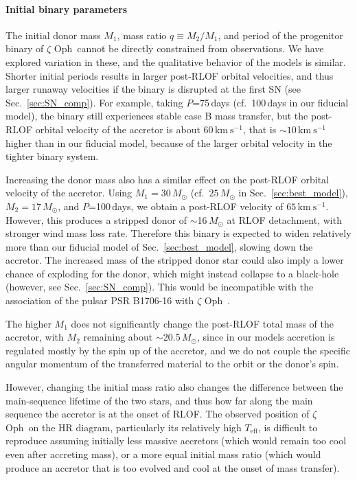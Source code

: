 \documentclass[twocolumn,twocolappendix,trackchanges]{aastex63}
\newcommand{\kms}{{\mathrm{km\ s^{-1}}}}
\DeclareRobustCommand{\Secref}[1]{Sec.~\ref{#1}}
\newcommand{\zoph}{$\zeta$ Oph}
\begin{document}
\paragraph{Initial binary parameters}
The initial donor mass $M_1$, mass ratio $q\equiv M_2/M_1$, and
period of the progenitor binary of \zoph\ cannot be directly
constrained from observations. We have explored variation in these,
and the qualitative behavior of the models is similar.  Shorter
initial periods results in larger post-RLOF orbital velocities, and
thus larger runaway velocities if the binary is disrupted at the first
SN (see \Secref{sec:SN_comp}). For example, taking $P$=75\,days (cf.\
100\,days in our fiducial model), the binary still experiences stable
case B mass transfer, but the post-RLOF orbital velocity of the
accretor is about $60\,\kms$, that is $\sim{}10\,\kms$ higher than in
our fiducial model, because of the larger orbital velocity in the
tighter binary system.

Increasing the donor mass also has a similar effect on the post-RLOF
orbital velocity of the accretor. Using $M_1=30\,M_\odot$ (cf.\
$25\,M_\odot$ in \Secref{sec:best_model}), $M_2=17\,M_\odot$, and
$P$=100\,days, we obtain a post-RLOF velocity of $65\,\kms$. However,
this produces a stripped donor of $\sim$16\,$M_\odot$ at RLOF
detachment, with stronger wind mass loss rate. Therefore this binary
is expected to widen relatively more than our fiducial model of
\Secref{sec:best_model}, slowing down the accretor. The increased mass
of the stripped donor star could also imply a lower chance of
exploding for the donor, which might instead collapse to a black-hole
(however, see \Secref{sec:SN_comp}). This would be incompatible with
the association of the pulsar PSR B1706-16 with \zoph\ \citep{neuhauser:20}.

The higher $M_1$ does not significantly change the post-RLOF total
mass of the accretor, with $M_2$ remaining about $\sim$20.5\,$M_\odot$, since
in our models accretion is regulated mostly by the spin up of the
accretor, and we do not couple the specific angular momentum of the transferred
material to the orbit or the donor's spin.

However, changing the initial mass ratio also changes the difference
between the main-sequence lifetime of the two stars, and thus how far
along the main sequence the accretor is at the onset of RLOF. The
observed position of \zoph\ on the HR diagram, particularly its
relatively high $T_\mathrm{eff}$, is difficult to reproduce assuming
initially less massive accretors (which would remain too cool even
after accreting mass), or a more equal initial mass ratio (which would
produce an accretor that is too evolved and cool at the onset of mass
transfer).
\end{document}

